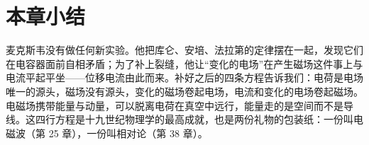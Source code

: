 \section*{本章小结}

麦克斯韦没有做任何新实验。他把库仑、安培、法拉第的定律摆在一起，发现它们在电容器面前自相矛盾；为了补上裂缝，他让“变化的电场”在产生磁场这件事上与电流平起平坐——位移电流由此而来。补好之后的四条方程告诉我们：电荷是电场唯一的源头，磁场没有源头，变化的磁场卷起电场，电流和变化的电场卷起磁场。电磁场携带能量与动量，可以脱离电荷在真空中远行，能量走的是空间而不是导线。这四行方程是十九世纪物理学的最高成就，也是两份礼物的包装纸：一份叫电磁波（第 25 章），一份叫相对论（第 38 章）。
